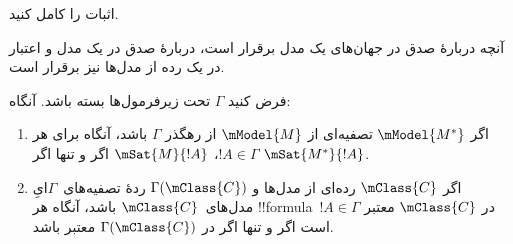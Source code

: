 \documentclass[../../../include/open-logic-section]{subfiles}
\begin{document}
\begin{prob}
  اثبات  را کامل کنید.
\end{prob}

آنچه دربارهٔ صدق در جهان‌های یک مدل برقرار است، دربارهٔ صدق در یک
مدل و اعتبار در یک رده از مدل‌ها نیز برقرار است.

\begin{cor}
  فرض کنید $\Gamma$ تحت زیرفرمول‌ها بسته باشد. آنگاه:
  \begin{enumerate}
  \item اگر $\mModel{M^*}$ تصفیه‌ای از $\mModel{M}$ از رهگذر
    $\Gamma$ باشد، آنگاه برای هر $!A \in \Gamma$، $\mSat{M}{!A}$ اگر
    و تنها اگر $\mSat{M^*}{!A}$.
  \item اگر $\mClass{C}$ رده‌ای از مدل‌ها و $\Gamma(\mClass{C})$
    ردهٔ تصفیه‌های~$\Gamma$ایِ مدل‌های~$\mClass{C}$ باشد، آنگاه هر
    !!{formula}~$!A \in \Gamma$ در $\mClass{C}$ معتبر است اگر و تنها
    اگر در $\Gamma(\mClass{C})$ معتبر باشد.
  \end{enumerate}
\end{cor}
\end{document}
